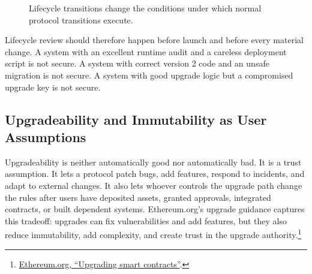 \begin{figure}[htbp]
\centering
{}
\caption{Lifecycle transitions change the conditions under which normal protocol transitions execute.}
\end{figure}

Lifecycle review should therefore happen before launch and before every material change. A system with an excellent runtime audit and a careless deployment script is not secure. A system with correct version 2 code and an unsafe migration is not secure. A system with good upgrade logic but a compromised upgrade key is not secure.

\subsection{Upgradeability and Immutability as User Assumptions}

Upgradeability is neither automatically good nor automatically bad. It is a trust assumption. It lets a protocol patch bugs, add features, respond to incidents, and adapt to external changes. It also lets whoever controls the upgrade path change the rules after users have deposited assets, granted approvals, integrated contracts, or built dependent systems. Ethereum.org's upgrade guidance captures this tradeoff: upgrades can fix vulnerabilities and add features, but they also reduce immutability, add complexity, and create trust in the upgrade authority.\footnote{\href{https://ethereum.org/developers/docs/smart-contracts/upgrading/}{Ethereum.org, ``Upgrading smart contracts''}.}

